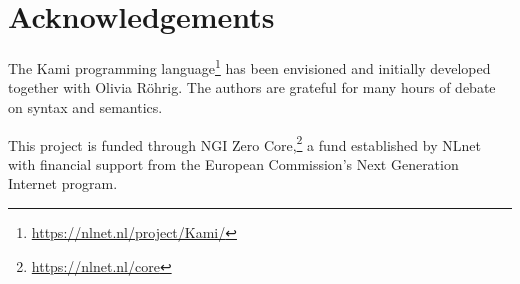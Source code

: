 \documentclass{scrartcl}
\theoremstyle{definition}
\theoremstyle{plain}
\begin{document}

\section*{Acknowledgements}
The Kami programming language\footnote{\url{https://nlnet.nl/project/Kami/}}
has been envisioned and initially developed together with Olivia Röhrig. The
authors are grateful for many hours of debate on syntax and semantics.

This project is funded through NGI Zero
Core,\footnote{\url{https://nlnet.nl/core}} a fund established by NLnet with
financial support from the European Commission's Next Generation Internet
program.





\end{document}
